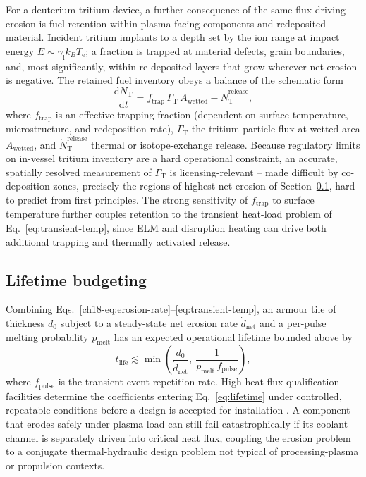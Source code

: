 For a deuterium-tritium device, a further consequence of the same flux driving erosion is fuel retention within plasma-facing components and redeposited material. Incident tritium implants to a depth set by the ion range at impact energy $E \sim \gamma_{\mathrm{i}} k_{B} T_{\mathrm{e}}$; a fraction is trapped at material defects, grain boundaries, and, most significantly, within re-deposited layers that grow wherever net erosion is negative. The retained fuel inventory obeys a balance of the schematic form
\begin{equation}
\frac{\mathrm{d}N_{\mathrm{T}}}{\mathrm{d}t} = f_{\mathrm{trap}}\,\Gamma_{\mathrm{T}}\,A_{\mathrm{wetted}} - \dot{N}_{\mathrm{T}}^{\mathrm{release}},
\label{eq:tritium}
\end{equation}
where $f_{\mathrm{trap}}$ is an effective trapping fraction (dependent on surface temperature, microstructure, and redeposition rate), $\Gamma_{\mathrm{T}}$ the tritium particle flux at wetted area $A_{\mathrm{wetted}}$, and $\dot{N}_{\mathrm{T}}^{\mathrm{release}}$ thermal or isotope-exchange release. Because regulatory limits on in-vessel tritium inventory are a hard operational constraint, an accurate, spatially resolved measurement of $\Gamma_{\mathrm{T}}$ is licensing-relevant -- made difficult by co-deposition zones, precisely the regions of highest net erosion of Section~\ref{sec:erosion-net}, hard to predict from first principles. The strong sensitivity of $f_{\mathrm{trap}}$ to surface temperature further couples retention to the transient heat-load problem of Eq.~\eqref{eq:transient-temp}, since ELM and disruption heating can drive both additional trapping and thermally activated release.

\subsection{Lifetime budgeting}
\label{sec:erosion-net}

Combining Eqs.~\eqref{ch18-eq:erosion-rate}--\eqref{eq:transient-temp}, an armour tile of thickness $d_{0}$ subject to a steady-state net erosion rate $\dot{d}_{\mathrm{net}}$ and a per-pulse melting probability $p_{\mathrm{melt}}$ has an expected operational lifetime bounded above by
\begin{equation}
t_{\mathrm{life}} \lesssim \min\left(\frac{d_{0}}{\dot{d}_{\mathrm{net}}},\ \frac{1}{p_{\mathrm{melt}}\, f_{\mathrm{pulse}}}\right),
\label{eq:lifetime}
\end{equation}
where $f_{\mathrm{pulse}}$ is the transient-event repetition rate. High-heat-flux qualification facilities determine the coefficients entering Eq.~\eqref{eq:lifetime} under controlled, repeatable conditions before a design is accepted for installation \cite{ref0586,ref0588}. A component that erodes safely under plasma load can still fail catastrophically if its coolant channel is separately driven into critical heat flux, coupling the erosion problem to a conjugate thermal-hydraulic design problem not typical of processing-plasma or propulsion contexts.

